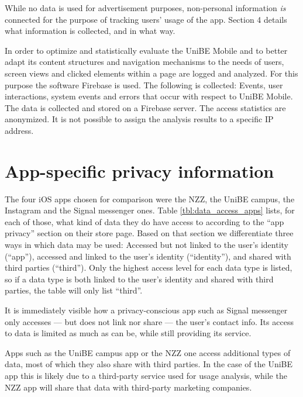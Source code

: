\documentclass[a4paper]{scrreprt}
\begin{document}
While no data is used for advertisement purposes, non-personal information
\emph{is} connected for the purpose of tracking users' usage of the app.
Section 4 details what information is collected, and in what way.

\begin{displayquote}
		In order to optimize and statistically evaluate the UniBE Mobile and to
		better adapt its content structures and navigation mechanisms to the
		needs of users, screen views and clicked elements within a page are
		logged and analyzed. For this purpose the software Firebase is used.
		The following is collected: Events, user interactions, system events
		and errors that occur with respect to UniBE Mobile. The data is
		collected and stored on a Firebase server. The access statistics are
		anonymized. It is not possible to assign the analysis results to a
		specific IP address.
\end{displayquote}

\section{App-specific privacy information}


The four iOS apps chosen for comparison were the NZZ, the UniBE campus, the
Instagram and the Signal messenger ones. Table \ref{tbl:data_access_apps}
lists, for each of those, what kind of data they do have access to according to
the ``app privacy'' section on their store page. Based on that section we
differentiate three ways in which data may be used: Accessed but not linked to
the user's identity (``app''), accessed and linked to the user's identity
(``identity''), and shared with third parties (``third''). Only the highest
access level for each data type is listed, so if a data type is both linked to
the user's identity and shared with third parties, the table will only list
``third''.

It is immediately visible how a privacy-conscious app such as Signal messenger
only accesses --- but does not link nor share --- the user's contact info. Its
access to data is limited as much as can be, while still providing its service.

Apps such as the UniBE campus app or the NZZ one access additional types of
data, most of which they also share with third parties. In the case of the
UniBE app this is likely due to a third-party service used for usage analysis,
while the NZZ app will share that data with third-party marketing companies.
\end{document}
